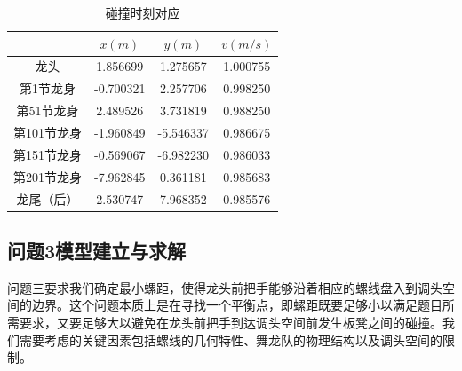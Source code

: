 \documentclass{cumcmthesis1}
\begin{document}
\begin{table}[h!]
    \caption{碰撞时刻对应}
    \centering
    \begin{tabular}{|c|c|c|c|}
    \hline
     & $x(m)$ & $y(m)$ & $v(m/s)$  \\
    \hline
    龙头 & 1.856699& 1.275657&1.000755\\
    \hline
     第1节龙身& -0.700321 & 2.257706 & 0.998250 \\
    \hline
     第51节龙身& 2.489526 & 3.731819& 0.988250  \\
    \hline
     第101节龙身& -1.960849 & -5.546337 & 0.986675  \\
    \hline
     第151节龙身& -0.569067&-6.982230  &0.986033\\
    \hline
     第201节龙身& -7.962845 & 0.361181 & 0.985683  \\
    \hline
     龙尾（后）& 2.530747 & 7.968352 & 0.985576\\
    \hline
    \end{tabular}
    \label{tab:example}
\end{table}


\subsection{\textbf{问题3}模型建立与求解}
问题三要求我们确定最小螺距，使得龙头前把手能够沿着相应的螺线盘入到调头空间的边界。这个问题本质上是在寻找一个平衡点，即螺距既要足够小以满足题目所需要求，又要足够大以避免在龙头前把手到达调头空间前发生板凳之间的碰撞。我们需要考虑的关键因素包括螺线的几何特性、舞龙队的物理结构以及调头空间的限制。\par
\end{document}
